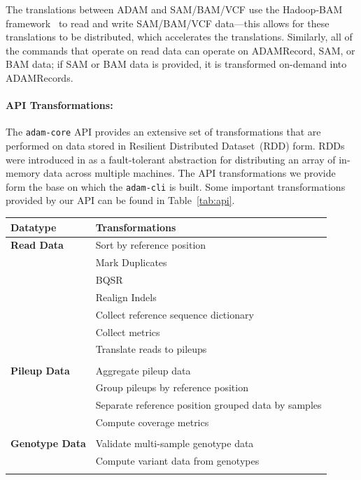 \documentclass{bioinfo}
\begin{document}
The translations between ADAM and SAM/BAM/VCF use the Hadoop-BAM framework~\citep[see][]{niemenmaa12} to read and write SAM/BAM/VCF data---this allows for these
translations to be distributed, which accelerates the translations. Similarly, all of the commands that operate on read data can operate on ADAMRecord, SAM, or BAM data;
if SAM or BAM data is provided, it is transformed on-demand into ADAMRecords.

\paragraph{API Transformations:}
\label{sec:api-transforms}

The \texttt{adam-core} API provides an extensive set of transformations that are performed on data stored in Resilient Distributed Dataset~(RDD) form. RDDs were introduced
in \citet{zaharia12} as a fault-tolerant abstraction for distributing an array of in-memory data across multiple machines. The API transformations we provide form the base on
which the \texttt{adam-cli} is built. Some important transformations provided by our API can be found in Table~\ref{tab:api}.

\begin{table}[h]
{\begin{tabular}{ l l }
\toprule
\bf Datatype & \bf Transformations \\
\midrule
\bf Read Data & Sort by reference position \\
 & Mark Duplicates \\
 & BQSR \\
 & Realign Indels \\
 & Collect reference sequence dictionary \\
 & Collect metrics \\
 & Translate reads to pileups \\
 & \\
\bf Pileup Data & Aggregate pileup data \\
 & Group pileups by reference position \\
 & Separate reference position grouped data by samples \\
 & Compute coverage metrics \\
 & \\
\bf Genotype Data & Validate multi-sample genotype data \\
 & Compute variant data from genotypes \\
\botrule
\end{tabular}}{}
\end{table}
\end{document}
